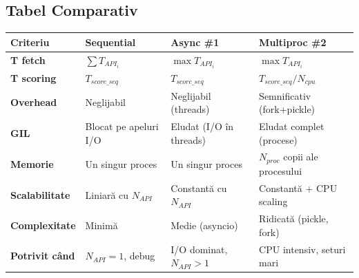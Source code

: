 \documentclass[12pt,a4paper]{article}
\newcommand{\thead}[1]{\cellcolor{tblh}\color{white}\textbf{#1}}
\begin{document}
\begin{center}
\end{center}

\subsection{Tabel Comparativ}

\begin{center}
\begin{tabularx}{\textwidth}{lXXX}
\toprule
\thead{Criteriu} & \thead{Sequential} & \thead{Async \#1} & \thead{Multiproc \#2} \\
\midrule
\textbf{T fetch}        & $\sum T_{API_i}$       & $\max T_{API_i}$         & $\max T_{API_i}$ \\
\textbf{T scoring}      & $T_{score\_seq}$       & $T_{score\_seq}$         & $T_{score\_seq} / N_{cpu}$ \\
\textbf{Overhead}       & Neglijabil             & Neglijabil (threads)     & Semnificativ (fork+pickle) \\
\textbf{GIL}            & Blocat pe apeluri I/O  & Eludat (I/O în threads)  & Eludat complet (procese) \\
\textbf{Memorie}        & Un singur proces       & Un singur proces         & $N_{proc}$ copii ale procesului \\
\textbf{Scalabilitate}  & Liniară cu $N_{API}$   & Constantă cu $N_{API}$   & Constantă + CPU scaling \\
\textbf{Complexitate}   & Minimă                 & Medie (asyncio)          & Ridicată (pickle, fork) \\
\textbf{Potrivit când}  & $N_{API} = 1$, debug   & I/O dominat, $N_{API}>1$ & CPU intensiv, seturi mari \\
\bottomrule
\end{tabularx}
\end{center}
\end{document}
